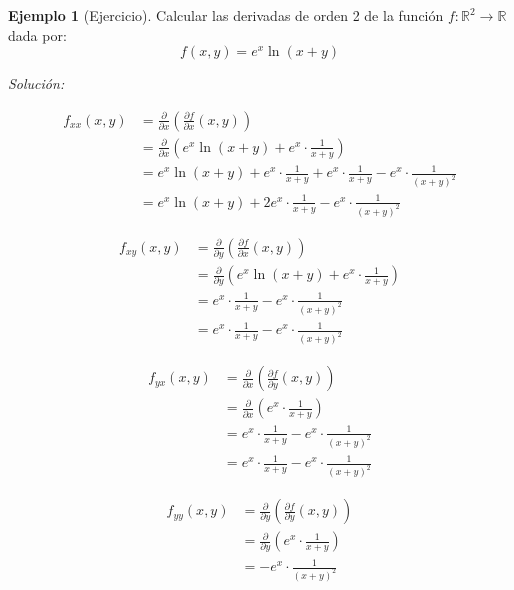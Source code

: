 \documentclass{article}
\newcommand{\R}{\mathbb{R}}
\theoremstyle{definition}
\newtheorem{example}[definition]{Ejemplo}
\theoremstyle{plain}
\theoremstyle{remark}
\theoremstyle{corollary}
\begin{document}
\begin{example}[Ejercicio]
Calcular las derivadas de orden 2 de la función $f : \R^2 \to \R$ dada por:
\[
f(x, y) = e^x \ln(x + y)
\]

\textit{Solución:}

\begin{align*}
f_{xx}(x, y) &= \frac{\partial}{\partial x} \left(  \frac{\partial f}{\partial x}(x, y) \right) \\
&= \frac{\partial}{\partial x} \left( e^x \ln(x + y) + e^x \cdot \frac{1}{x + y} \right) \\
&= e^x \ln(x + y) + e^x \cdot \frac{1}{x + y} + e^x \cdot \frac{1}{x + y} - e^x \cdot \frac{1}{(x + y)^2} \\
&= e^x \ln(x + y) + 2 e^x \cdot \frac{1}{x + y} - e^x \cdot \frac{1}{(x + y)^2}
\end{align*}

\begin{align*}
f_{xy}(x, y) &= \frac{\partial}{\partial y} \left(  \frac{\partial f}{\partial x}(x, y) \right) \\
&= \frac{\partial}{\partial y} \left( e^x \ln(x + y) + e^x \cdot \frac{1}{x + y} \right) \\
&= e^x \cdot \frac{1}{x + y} - e^x \cdot \frac{1}{(x + y)^2} \\
&= e^x \cdot \frac{1}{x + y} - e^x \cdot \frac{1}{(x + y)^2}
\end{align*}

\begin{align*}
f_{yx}(x, y) &= \frac{\partial}{\partial x} \left(  \frac{\partial f}{\partial y}(x, y) \right) \\
&= \frac{\partial}{\partial x} \left( e^x \cdot \frac{1}{x + y} \right) \\
&= e^x \cdot \frac{1}{x + y} - e^x \cdot \frac{1}{(x + y)^2} \\
&= e^x \cdot \frac{1}{x + y} - e^x \cdot \frac{1}{(x + y)^2}
\end{align*}

\begin{align*}
f_{yy}(x, y) &= \frac{\partial}{\partial y} \left(  \frac{\partial f}{\partial y}(x, y) \right) \\
&= \frac{\partial}{\partial y} \left( e^x \cdot \frac{1}{x + y} \right) \\
&= - e^x \cdot \frac{1}{(x + y)^2}
\end{align*}

\end{example}
\end{document}
